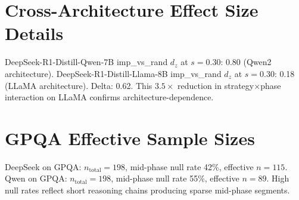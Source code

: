 \documentclass[11pt,a4paper]{article}
\begin{document}



\appendix
\section{Cross-Architecture Effect Size Details}

DeepSeek-R1-Distill-Qwen-7B imp\_vs\_rand $d_z$ at $s=0.30$: 0.80 (Qwen2 architecture). DeepSeek-R1-Distill-Llama-8B imp\_vs\_rand $d_z$ at $s=0.30$: 0.18 (LLaMA architecture). Delta: 0.62. This $3.5\times$ reduction in strategy$\times$phase interaction on LLaMA confirms architecture-dependence.

\section{GPQA Effective Sample Sizes}

DeepSeek on GPQA: $n_{\text{total}} = 198$, mid-phase null rate 42\%, effective $n = 115$. Qwen on GPQA: $n_{\text{total}} = 198$, mid-phase null rate 55\%, effective $n = 89$. High null rates reflect short reasoning chains producing sparse mid-phase segments.
\end{document}
